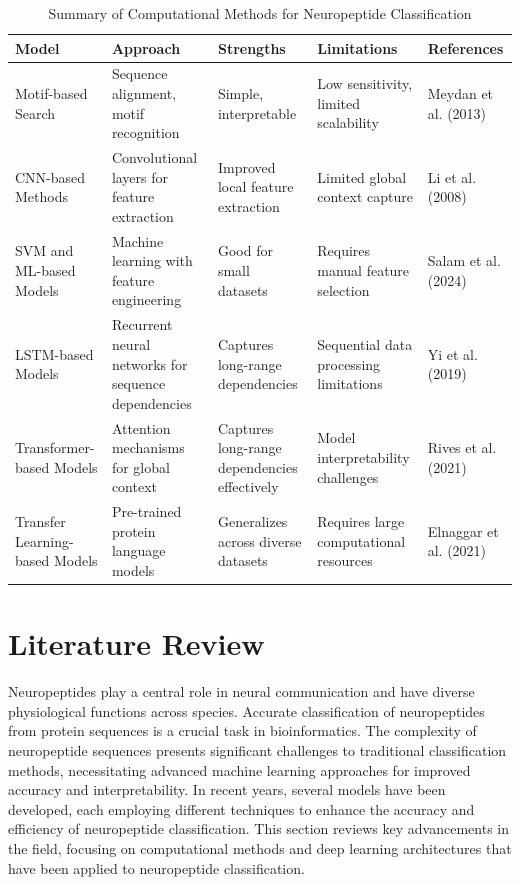 \documentclass[conference]{IEEEtran}
\begin{document}
\begin{table}[ht]
\centering
\caption{Summary of Computational Methods for Neuropeptide Classification}
\begin{tabular}{|p{2.5cm}|p{3.5cm}|p{3.5cm}|p{3.5cm}|p{2.5cm}|}
\hline
\textbf{Model} & \textbf{Approach} & \textbf{Strengths} & \textbf{Limitations} & \textbf{References} \\
\hline
Motif-based Search & Sequence alignment, motif recognition & Simple, interpretable & Low sensitivity, limited scalability & Meydan et al. (2013) \cite{meydan2013} \\
\hline
CNN-based Methods & Convolutional layers for feature extraction & Improved local feature extraction & Limited global context capture & Li et al. (2008) \cite{li2008} \\
\hline
SVM and ML-based Models & Machine learning with feature engineering & Good for small datasets & Requires manual feature selection & Salam et al. (2024) \cite{salam2024} \\
\hline
LSTM-based Models & Recurrent neural networks for sequence dependencies & Captures long-range dependencies & Sequential data processing limitations & Yi et al. (2019) \cite{yi2019} \\
\hline
Transformer-based Models & Attention mechanisms for global context & Captures long-range dependencies effectively & Model interpretability challenges & Rives et al. (2021) \cite{rives2021} \\
\hline
Transfer Learning-based Models & Pre-trained protein language models & Generalizes across diverse datasets & Requires large computational resources & Elnaggar et al. (2021) \cite{elnaggar2021} \\
\hline
\end{tabular}
\end{table}

\section{Literature Review}

Neuropeptides play a central role in neural communication and have diverse physiological functions across species. Accurate classification of neuropeptides from protein sequences is a crucial task in bioinformatics. The complexity of neuropeptide sequences presents significant challenges to traditional classification methods, necessitating advanced machine learning approaches for improved accuracy and interpretability. In recent years, several models have been developed, each employing different techniques to enhance the accuracy and efficiency of neuropeptide classification. This section reviews key advancements in the field, focusing on computational methods and deep learning architectures that have been applied to neuropeptide classification.
\end{document}
